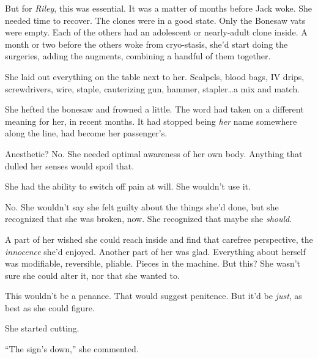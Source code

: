 But for \emph{Riley}, this was essential.  It was a matter of months before Jack woke.  She needed time to recover.  The clones were in a good state.  Only the Bonesaw vats were empty.  Each of the others had an adolescent or nearly-adult clone inside.  A month or two before the others woke from cryo-stasis, she'd start doing the surgeries, adding the augments, combining a handful of them together.



She laid out everything on the table next to her.  Scalpels, blood bags, IV drips, screwdrivers, wire, staple, cauterizing gun, hammer, stapler\ldots a mix and match.



She hefted the bonesaw and frowned a little.  The word had taken on a different meaning for her, in recent months.  It had stopped being \emph{her} name somewhere along the line, had become her passenger's.



Anesthetic?  No.  She needed optimal awareness of her own body.  Anything that dulled her senses would spoil that.



She had the ability to switch off pain at will.  She wouldn't use it.



No.  She wouldn't say she felt guilty about the things she'd done, but she recognized that she was broken, now.  She recognized that maybe she \emph{should}.



A part of her wished she could reach inside and find that carefree perspective, the \emph{innocence} she'd enjoyed.  Another part of her was glad.  Everything about herself was modifiable, reversible, pliable.  Pieces in the machine.  But this?  She wasn't sure she could alter it, nor that she wanted to.



This wouldn't be a penance.  That would suggest penitence.  But it'd be \emph{just}, as best as she could figure.



She started cutting.



\blacksquare






``The sign's down,'' she commented.



